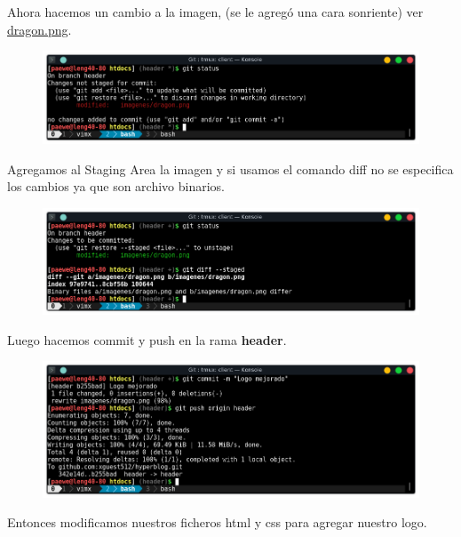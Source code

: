 \documentclass{article}
\begin{document}
\newpage

Ahora hacemos un cambio a la imagen, (se le agregó una cara sonriente) ver
\href{https://github.com/xguest512/hyperblog/raw/b255bad5ad8d7bca0c639e3d96ab5fa59d685e80/imagenes/dragon.png}{dragon.png}.

\begin{figure}[h!]
  \centering
  \includegraphics[scale=0.75]{./Pictures/276_dragon_modified.png}
\end{figure}

Agregamos al Staging Area la imagen y si usamos el comando diff no se
especifica los cambios ya que son archivo binarios.

\begin{figure}[h!]
  \centering
  \includegraphics[scale=0.75]{./Pictures/277_status_diff.png}
\end{figure}

Luego hacemos commit y push en la rama \textbf{header}.

\begin{figure}[h!]
  \centering
  \includegraphics[scale=0.75]{./Pictures/278_commit_push.png}
\end{figure}

Entonces modificamos nuestros ficheros html y css para agregar nuestro logo.\\
\end{document}
